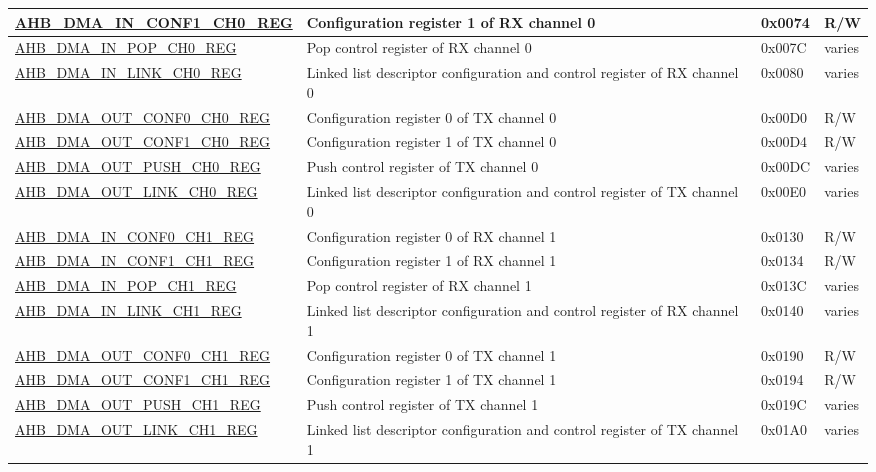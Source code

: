 \begin{longtable}{ | p{8cm} | p{8cm} | p{1.3cm} | p{1.5cm} | }
\hyperref[regdesc:AHBDMAINCONF1CHNREG]{AHB\_DMA\_IN\_CONF1\_CH0\_REG} & Configuration register 1 of RX channel 0 & 0x0074 & R/W \\ \hline
\hyperref[regdesc:AHBDMAINPOPCHNREG]{AHB\_DMA\_IN\_POP\_CH0\_REG} & Pop control register of RX channel 0 & 0x007C & varies \\ \hline
\hyperref[regdesc:AHBDMAINLINKCHNREG]{AHB\_DMA\_IN\_LINK\_CH0\_REG} & Linked list descriptor configuration and control register of RX channel 0 & 0x0080 & varies \\ \hline
\hyperref[regdesc:AHBDMAOUTCONF0CHNREG]{AHB\_DMA\_OUT\_CONF0\_CH0\_REG} & Configuration register 0 of TX channel 0 & 0x00D0 & R/W \\ \hline
\hyperref[regdesc:AHBDMAOUTCONF1CHNREG]{AHB\_DMA\_OUT\_CONF1\_CH0\_REG} & Configuration register 1 of TX channel 0 & 0x00D4 & R/W \\ \hline
\hyperref[regdesc:AHBDMAOUTPUSHCHNREG]{AHB\_DMA\_OUT\_PUSH\_CH0\_REG} & Push control register of TX channel 0 & 0x00DC & varies \\ \hline
\hyperref[regdesc:AHBDMAOUTLINKCHNREG]{AHB\_DMA\_OUT\_LINK\_CH0\_REG} & Linked list descriptor configuration and control register of TX channel 0 & 0x00E0 & varies \\ \hline
\hyperref[regdesc:AHBDMAINCONF0CHNREG]{AHB\_DMA\_IN\_CONF0\_CH1\_REG} & Configuration register 0 of RX channel 1 & 0x0130 & R/W \\ \hline
\hyperref[regdesc:AHBDMAINCONF1CHNREG]{AHB\_DMA\_IN\_CONF1\_CH1\_REG} & Configuration register 1 of RX channel 1 & 0x0134 & R/W \\ \hline
\hyperref[regdesc:AHBDMAINPOPCHNREG]{AHB\_DMA\_IN\_POP\_CH1\_REG} & Pop control register of RX channel 1 & 0x013C & varies \\ \hline
\hyperref[regdesc:AHBDMAINLINKCHNREG]{AHB\_DMA\_IN\_LINK\_CH1\_REG} & Linked list descriptor configuration and control register of RX channel 1 & 0x0140 & varies \\ \hline
\hyperref[regdesc:AHBDMAOUTCONF0CHNREG]{AHB\_DMA\_OUT\_CONF0\_CH1\_REG} & Configuration register 0 of TX channel 1 & 0x0190 & R/W \\ \hline
\hyperref[regdesc:AHBDMAOUTCONF1CHNREG]{AHB\_DMA\_OUT\_CONF1\_CH1\_REG} & Configuration register 1 of TX channel 1 & 0x0194 & R/W \\ \hline
\hyperref[regdesc:AHBDMAOUTPUSHCHNREG]{AHB\_DMA\_OUT\_PUSH\_CH1\_REG} & Push control register of TX channel 1 & 0x019C & varies \\ \hline
\hyperref[regdesc:AHBDMAOUTLINKCHNREG]{AHB\_DMA\_OUT\_LINK\_CH1\_REG} & Linked list descriptor configuration and control register of TX channel 1 & 0x01A0 & varies \\ \hline

\end{longtable}
